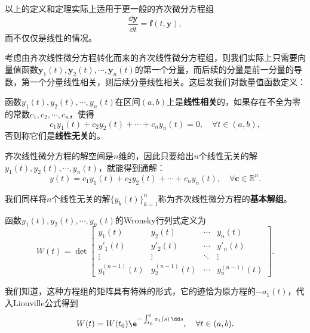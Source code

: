 以上的定义和定理实际上适用于更一般的齐次微分方程组
\begin{equation}
    \frac{\dd\mathbf{y}}{\dd t}=\mathbf{f}(t,\mathbf{y}),
\end{equation}
而不仅仅是线性的情况。

考虑由齐次线性微分方程转化而来的齐次线性微分方程组，则我们实际上只需要向量值函数$\mathbf{y}_1(t),\mathbf{y}_2(t),\cdots,\mathbf{y}_n(t)$的第一个分量，而后续的分量是前一分量的导数，第一个分量线性相关，则后续分量线性相关。这启发我们对数量值函数定义：
\begin{definition}[数量值函数的线性相关性]
    函数$y_1(t),y_2(t),\cdots,y_n(t)$在区间$(a,b)$上是\textbf{线性相关}的，如果存在不全为零的常数$c_1,c_2,\cdots,c_n$，使得
    \begin{equation}
        c_1y_1(t)+c_2y_2(t)+\cdots+c_ny_n(t)=0,\quad \forall t\in(a,b),
    \end{equation}
    否则称它们是\textbf{线性无关}的。
\end{definition}

齐次线性微分方程的解空间是$n$维的，因此只要给出$n$个线性无关的解$y_1(t),y_2(t),\cdots,y_n(t)$，就能得到通解：
\begin{equation}
    y(t)=c_1y_1(t)+c_2y_2(t)+\cdots+c_ny_n(t),\quad \forall \mathbf{c}\in\mathbb{R}^n.
\end{equation}

我们同样将$n$个线性无关的解$\{y_k(t)\}_{k=1}^n$称为齐次线性微分方程的\textbf{基本解组}。

\begin{definition}[Wronsky行列式]
    函数$y_1(t),y_2(t),\cdots,y_n(t)$的Wronsky行列式定义为
    \begin{equation}
        W(t)=\det\begin{bmatrix}
        y_1(t) & y_2(t) & \cdots & y_n(t)\\
        y'_1(t) & y'_2(t) & \cdots & y'_n(t)\\
        \vdots & \vdots & \ddots & \vdots\\
        y_1^{(n-1)}(t) & y_2^{(n-1)}(t) & \cdots & y_n^{(n-1)}(t)
        \end{bmatrix}.
    \end{equation}
\end{definition}

我们知道，这种方程组的矩阵具有特殊的形式，它的迹恰为原方程的$-a_1(t)$，代入Liouville公式得到
\begin{equation}
    W(t)=W(t_0)\e^{-\int_{t_0}^t a_1(s)\,\dd s},\quad \forall t\in(a,b).
\end{equation}

